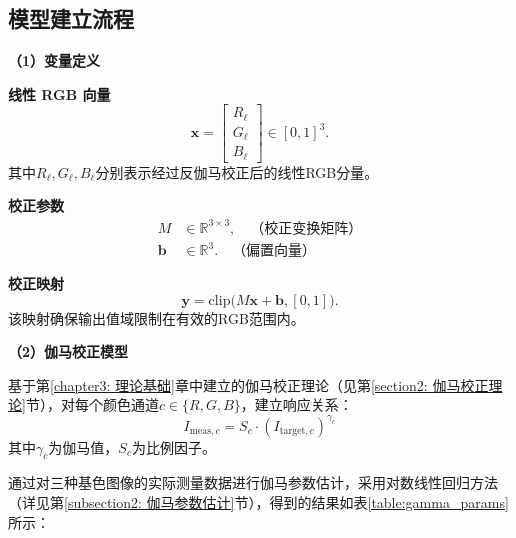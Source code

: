 \subsection[\hspace{-2pt}模型建立流程]{{\heiti{}\hspace{-8pt}模型建立流程}}\label{subsec:3-model-build}

\noindent \textbf{（1）变量定义}

 \textbf{线性 RGB 向量}
\begin{equation}
  \mathbf{x}=\begin{bmatrix}R_\ell\\G_\ell\\B_\ell\end{bmatrix}\in[0,1]^3.
\end{equation}
其中$R_\ell, G_\ell, B_\ell$分别表示经过反伽马校正后的线性RGB分量。

 \textbf{校正参数}
\begin{align}
  M &\in\mathbb{R}^{3\times3}, \quad \text{（校正变换矩阵）}\\
  \mathbf{b} &\in\mathbb{R}^3. \quad \text{（偏置向量）}
\end{align}

 \textbf{校正映射}
\begin{equation}
  \mathbf{y}=\mathrm{clip}\!\bigl(M\mathbf{x}+\mathbf{b},[0,1]\bigr).
\end{equation}
该映射确保输出值域限制在有效的RGB范围内。

\noindent\textbf{（2）伽马校正模型}

基于第\ref{chapter3: 理论基础}章中建立的伽马校正理论（见第\ref{section2: 伽马校正理论}节），对每个颜色通道$c \in \{R,G,B\}$，建立响应关系：
\begin{equation}
  I_{\text{meas},c} = S_c \cdot (I_{\text{target},c})^{\gamma_c}
\end{equation}
其中$\gamma_c$为伽马值，$S_c$为比例因子。

通过对三种基色图像的实际测量数据进行伽马参数估计，采用对数线性回归方法（详见第\ref{subsection2: 伽马参数估计}节），得到的结果如表\ref{table:gamma_params}所示：

